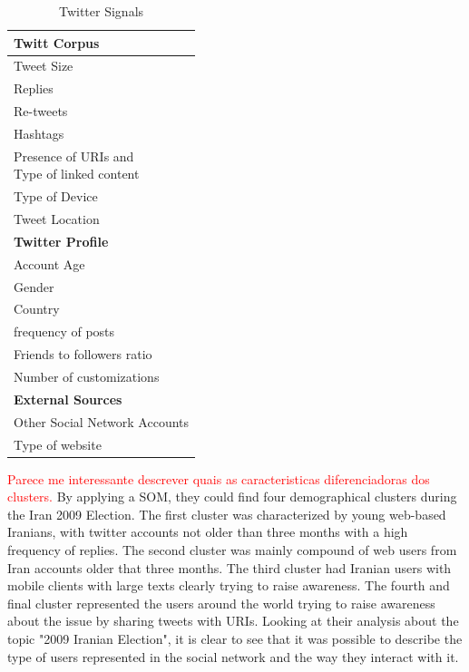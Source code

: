 \begin{table}[H]
  \caption{Twitter Signals}
  \label{tab:twitter_signals}
  \begin{center}
    \begin{tabular}{|l|}
      \hline
      \textbf{Twitt Corpus}  \\
      \hline
      Tweet Size \\
      \hline
      Replies \\
      \hline
      Re-tweets \\
      \hline
      Hashtags  \\
      \hline
      \specialcell{Presence of URIs and \\ Type of linked content} \\
      \hline
      Type of Device   \\
      \hline
      Tweet Location  \\
      \hline                 
      \hline                 
      \textbf{Twitter Profile} \\ 
      \hline
      Account Age   \\
      \hline
      Gender     \\
      \hline
      Country \\    
      \hline
      frequency of posts \\
      \hline
      Friends to followers ratio \\ 
      \hline
      Number of  customizations \\   
      \hline
      \hline
      \textbf{External Sources} \\
      \hline
      Other Social Network Accounts   \\
      \hline
      Type of website\\ 
      \hline
    \end{tabular}
  \end{center}
\end{table}

\textcolor{red}{Parece me interessante descrever quais as caracteristicas diferenciadoras dos clusters.}
By applying a \ac{SOM}, they could find four demographical clusters during the Iran 2009 Election. The first cluster was characterized by young web-based Iranians, with twitter accounts not older than three months with a high frequency of replies. The second cluster was mainly compound of web users from Iran accounts older that three months. The third cluster had Iranian users with mobile clients with large texts clearly trying to raise awareness. The fourth and final cluster represented the users around the world trying to raise awareness about the issue by sharing tweets with URIs.
Looking at their analysis about the topic "2009 Iranian Election", it is clear to see that it was possible to describe the type of users represented in the social network and the way they interact with it.

